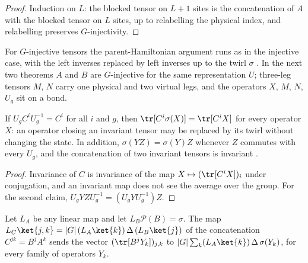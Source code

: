 \begin{proof}\leanok
    Induction on $L$: the blocked tensor on $L+1$ sites is the concatenation
    of $A$ with the blocked tensor on $L$ sites, up to relabelling the
    physical index, and relabelling preserves $G$-injectivity.
\end{proof}

For $G$-injective tensors the parent-Hamiltonian argument runs as in the
injective case, with the left inverses replaced by left inverses up to the
twirl $\sigma$
\cite[Section~``Parent Hamiltonians'']{Schuch2010PEPS}. In the next two
theorems $A$ and $B$ are $G$-injective for the same representation $U$; three-leg
tensors $M$, $N$ carry one physical and two virtual legs, and the operators $X$,
$M$, $N$, $U_g$ sit on a bond.

\begin{lemma}%
    \label{lem:peps_mps_g_injective_twirl}
    \leanok
    If $U_gC^iU_g^{-1}=C^i$ for all $i$ and $g$, then
    $\tr[C^i\sigma(X)]=\tr[C^iX]$ for every operator $X$: an operator closing
    an invariant tensor may be replaced by its twirl without changing the
    state. In addition, $\sigma(YZ)=\sigma(Y)Z$ whenever $Z$ commutes with every
    $U_g$, and the concatenation of two invariant tensors is invariant
    \cite[Section~``Parent Hamiltonians'']{Schuch2010PEPS}.
\end{lemma}

\begin{proof}\leanok
    Invariance of $C$ is invariance of the map $X\mapsto(\tr[C^iX])_i$ under
    conjugation, and an invariant map does not see the average over the
    group. For the second claim, $U_gYZU_g^{-1}=(U_gYU_g^{-1})Z$.
\end{proof}

\begin{lemma}%
    \label{lem:peps_mps_g_injective_left_inverse_traces}
    \leanok
    Let $L_A$ be any linear map and let $L_B\mathcal{P}(B)=\sigma$. The map
    $L_C\ket{j,k}=|G|\,(L_A\ket{k})\,\Delta\,(L_B\ket{j})$ of the concatenation
    $C^{jk}=B^jA^k$ sends the vector $(\tr[B^jY_k])_{j,k}$ to
    $|G|\sum_k(L_A\ket{k})\,\Delta\,\sigma(Y_k)$, for every family of
    operators $Y_k$.
\end{lemma}

